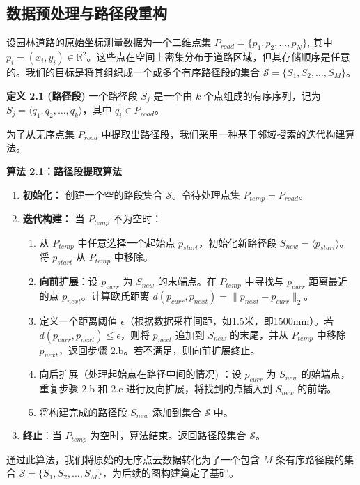 \documentclass[11pt]{article}
\theoremstyle{definition}
\begin{document}
\subsection*{数据预处理与路径段重构}

设园林道路的原始坐标测量数据为一个二维点集 $P_{road} = \{p_1, p_2, \dots, p_N\}$, 其中 $p_i = (x_i, y_i) \in \mathbb{R}^2$。这些点在空间上密集分布于道路区域，但其存储顺序是任意的。我们的目标是将其组织成一个或多个有序路径段的集合 $\mathcal{S} = \{S_1, S_2, \dots, S_M\}$。

\textbf{定义 2.1 (路径段)} 一个路径段 $S_j$ 是一个由 $k$ 个点组成的有序序列，记为 $S_j = \langle q_1, q_2, \dots, q_k \rangle$，其中 $q_i \in P_{road}$。

为了从无序点集 $P_{road}$ 中提取出路径段，我们采用一种基于邻域搜索的迭代构建算法。

\textbf{算法 2.1：路径段提取算法}
\begin{enumerate}
	\item \textbf{初始化：} 创建一个空的路段集合 $\mathcal{S}$。令待处理点集 $P_{temp} = P_{road}$。
	\item \textbf{迭代构建：} 当 $P_{temp}$ 不为空时：
	\begin{enumerate}
		\item 从 $P_{temp}$ 中任意选择一个起始点 $p_{start}$，初始化新路径段 $S_{new} = \langle p_{start} \rangle$。将 $p_{start}$ 从 $P_{temp}$ 中移除。
		\item \textbf{向前扩展}：设 $p_{curr}$ 为 $S_{new}$ 的末端点。在 $P_{temp}$ 中寻找与 $p_{curr}$ 距离最近的点 $p_{next}$。计算欧氏距离 $d(p_{curr}, p_{next}) = \|p_{next} - p_{curr}\|_2$。
		\item 定义一个距离阈值 $\epsilon$（根据数据采样间距，如1.5米，即1500mm）。若 $d(p_{curr}, p_{next}) \le \epsilon$，则将 $p_{next}$ 追加到 $S_{new}$ 的末尾，并从 $P_{temp}$ 中移除 $p_{next}$，返回步骤 2.b。若不满足，则向前扩展终止。
		\item 向后扩展（处理起始点在路径中间的情况) ：设 $p_{curr}$ 为 $S_{new}$ 的始端点，重复步骤 2.b 和 2.c 进行反向扩展，将找到的点插入到 $S_{new}$ 的前端。
		\item 将构建完成的路径段 $S_{new}$ 添加到集合 $\mathcal{S}$ 中。
	\end{enumerate}
	
	\item  \textbf{终止}：当 $P_{temp}$ 为空时，算法结束。返回路径段集合 $\mathcal{S}$。
\end{enumerate}

通过此算法，我们将原始的无序点云数据转化为了一个包含 $M$ 条有序路径段的集合 $\mathcal{S} = \{S_1, S_2, \dots, S_M\}$，为后续的图构建奠定了基础。
\end{document}
